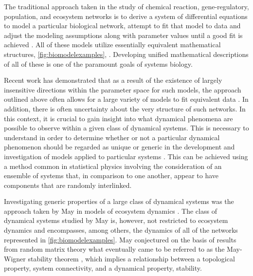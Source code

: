 The traditional approach taken in the study of chemical reaction, gene-regulatory, population, and ecosystem networks is to derive a system of differential equations to model a particular biological network, attempt to fit that model to data and adjust the modeling assumptions along with parameter values until a good fit is achieved \cite{Meyer2014}. All of these models utilize essentially equivalent mathematical structures, \ref{fig:biomodelexamples}, \cite{RossCr2003,Palsson2011a,Sauro2012}. Developing unified mathematical descriptions of all of these is one of the paramount goals of systems biology.

Recent work has demonstrated that as a result of the existence of largely insensitive directions within the parameter space for such models, the approach outlined above often allows for a large variety of models to fit equivalent data \cite{Machta2013,Hines2014,Prabakaran2014,Tonsing2014}. In addition, there is often uncertainty about the very structure of such networks. In this context, it is crucial to gain insight into what dynamical phenomena are possible to observe within a given class of dynamical systems. This is necessary to understand in order to determine whether or not a particular dynamical phenomenon should be regarded as unique or generic in the development and investigation of models applied to particular systems \cite{Gunawardena2013,Gunawardena2014}. This can be achieved using a method common in statistical physics involving the consideration of an ensemble of systems that, in comparison to one another, appear to have components that are randomly interlinked.

Investigating generic properties of a large class of dynamical systems was the approach taken by May in models of ecosystem dynamics \cite{Gardner1970,May1972}. The class of dynamical systems studied by May is, however, not restricted to ecosystem dynamics and encompasses, among others, the dynamics of all of the networks represented in \ref{fig:biomodelexamples}. May conjectured on the basis of results from random matrix theory what eventually came to be referred to as the May-Wigner stability theorem \cite{Cohen1984,May1972a,Radius2014,Majumdar2014}, which implies a relationship between a topological property, system connectivity, and a dynamical property, stability.

